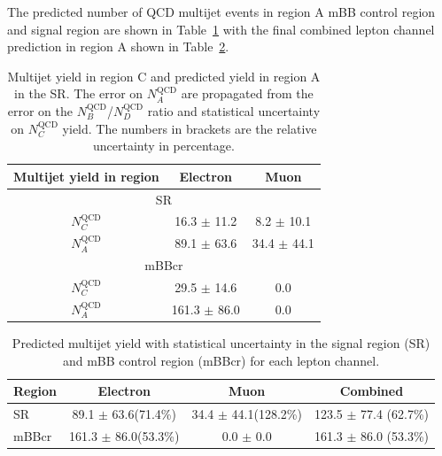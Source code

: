 The predicted number of QCD multijet events in region A mBB control region and signal region are shown in Table~\ref{tab:boosted_bkgd_mcscaled_abcd_yield}
with the final combined lepton channel prediction in region A shown in Table~\ref{tab:boosted_bkgd_mcscaled_norm_unc}.

\begin{table}[!htbp]
\begin{center}
\begin{tabular}{c|c|c}
Multijet yield in region & Electron  & Muon  \\  
\hline
\multicolumn{3}{c}{SR} \\
\hline
$N_C^\text{QCD}$         & 16.3 $\pm$ 11.2 & 8.2 $\pm$ 10.1  \\
$N_A^\text{QCD}$         & 89.1 $\pm$ 63.6 & 34.4 $\pm$ 44.1 \\
\hline
\multicolumn{3}{c}{mBBcr} \\
\hline
$N_C^\text{QCD}$         & 29.5  $\pm$ 14.6  & 0.0   \\
$N_A^\text{QCD}$         & 161.3 $\pm$ 86.0  & 0.0   \\
\hline
\end{tabular}
\end{center}
\caption{Multijet yield in region C and predicted yield in region A in the SR. The error on $N_A^\text{QCD}$
are propagated from the error on the $N_B^\text{QCD}$/$N_D^\text{QCD}$ ratio and statistical uncertainty on $N_C^\text{QCD}$ yield.
The numbers in brackets are the relative uncertainty in percentage.} 
\label{tab:boosted_bkgd_mcscaled_abcd_yield}
\end{table}

\begin{table}[!htbp]
\begin{center}
\begin{tabular}{l|c|c|c}
Region    & Electron                   & Muon                       & Combined                   \\  
\hline 
SR        & 89.1 $\pm$ 63.6(71.4\%)   & 34.4 $\pm$ 44.1(128.2\%) & 123.5 $\pm$ 77.4 (62.7\%)  \\
mBBcr     & 161.3 $\pm$ 86.0(53.3\%)  & 0.0 $\pm$ 0.0            & 161.3 $\pm$ 86.0 (53.3\%) \\
\hline 
\end{tabular}
\end{center}
\caption{Predicted multijet yield with statistical uncertainty in the signal region (SR) and mBB control region (mBBcr) 
for each lepton channel.} 
\label{tab:boosted_bkgd_mcscaled_norm_unc}
\end{table}



